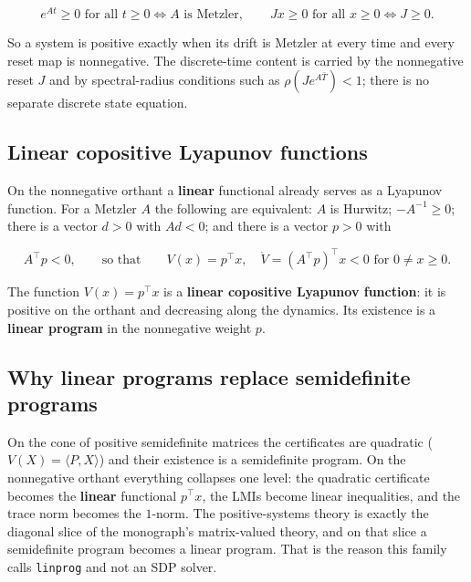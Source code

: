 \documentclass[11pt,oneside]{report}
\newcommand{\code}[1]{\texttt{#1}}
\begin{document}
\[
e^{A t} \ge 0 \text{ for all } t \ge 0 \iff A \text{ is Metzler},
\qquad
J x \ge 0 \text{ for all } x \ge 0 \iff J \ge 0 .
\]

So a system is positive exactly when its drift is Metzler at every time and
every reset map is nonnegative. The discrete-time content is carried by the
nonnegative reset \(J\) and by spectral-radius conditions such as
\(\rho(J e^{A \bar T}) < 1\); there is no separate discrete state equation.

\hypertarget{linear-copositive-lyapunov-functions}{%
\subsection{Linear copositive Lyapunov functions}\label{linear-copositive-lyapunov-functions}}

On the nonnegative orthant a \textbf{linear} functional already serves as a Lyapunov
function. For a Metzler \(A\) the following are equivalent: \(A\) is Hurwitz;
\(-A^{-1} \ge 0\); there is a vector \(d > 0\) with \(A d < 0\); and there is a vector
\(p > 0\) with

\[
A^\top p < 0,
\qquad\text{so that}\qquad
V(x) = p^\top x, \quad \dot V = (A^\top p)^\top x < 0 \text{ for } 0 \ne x \ge 0 .
\]

The function \(V(x) = p^\top x\) is a \textbf{linear copositive Lyapunov function}: it is
positive on the orthant and decreasing along the dynamics. Its existence is a
\textbf{linear program} in the nonnegative weight \(p\).

\hypertarget{why-linear-programs-replace-semidefinite-programs}{%
\subsection{Why linear programs replace semidefinite programs}\label{why-linear-programs-replace-semidefinite-programs}}

On the cone of positive semidefinite matrices the certificates are quadratic
(\(V(X) = \langle P, X \rangle\)) and their existence is a semidefinite program.
On the nonnegative orthant everything collapses one level: the quadratic
certificate becomes the \textbf{linear} functional \(p^\top x\), the LMIs become linear
inequalities, and the trace norm becomes the \(1\)-norm. The positive-systems
theory is exactly the diagonal slice of the monograph's matrix-valued theory, and
on that slice a semidefinite program becomes a linear program. That is the reason
this family calls \code{linprog} and not an SDP solver.
\end{document}
